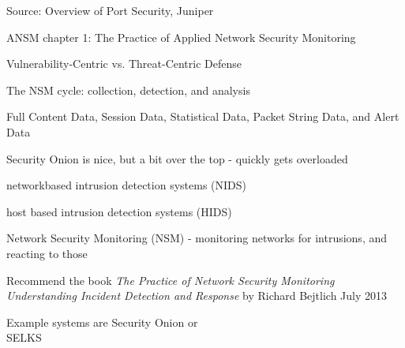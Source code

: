 \documentclass[Screen16to9,17pt]{foils}
\begin{document}
Source: Overview of Port Security, Juniper\\ {\small{}}






\begin{list1}
\item ANSM chapter 1: The Practice of Applied
Network Security Monitoring
\begin{list2}
\item Vulnerability-Centric vs. Threat-Centric Defense
\item The NSM cycle: collection, detection, and analysis
\item Full Content Data, Session Data, Statistical Data, Packet String Data, and Alert Data
\item Security Onion is nice, but a bit over the top - quickly gets overloaded
\end{list2}
\end{list1}



\begin{list2}
\item networkbased intrusion detection systems (NIDS)
\item host based intrusion detection systems (HIDS)
\end{list2}




\begin{list1}
\item Network Security Monitoring (NSM) - monitoring networks for intrusions, and reacting to those
\item Recommend the book \emph{The Practice of Network Security Monitoring
Understanding Incident Detection and Response}
by Richard Bejtlich
July 2013
\item Example systems are Security Onion  or\\ SELKS 
\end{list1}




\end{document}
